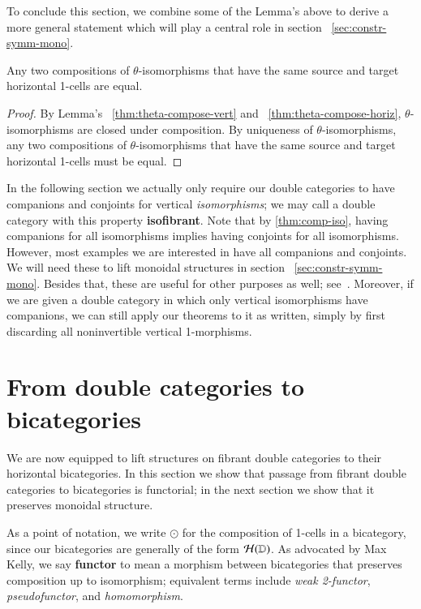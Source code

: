 \documentclass{amsart}
\begin{document}
To conclude this section, we combine some of the Lemma's above to derive a more general statement which will play a central role in section ~\ref{sec:constr-symm-mono}.

\begin{lem}\label{lem:equal}
Any two compositions of $\theta$-isomorphisms that have the same source and target horizontal 1-cells are equal.
\end{lem}

\begin{proof}
By Lemma's ~\ref{thm:theta-compose-vert} and ~\ref{thm:theta-compose-horiz}, $\theta$-isomorphisms are closed under composition. By uniqueness of $\theta$-isomorphisms, any two compositions of $\theta$-isomorphisms that have the same source and target horizontal 1-cells must be equal.
\end{proof}

\begin{rmk}
  In the following section we actually only require our double
  categories to have companions and conjoints for vertical
  \emph{isomorphisms}; we may call a double category with this
  property \textbf{isofibrant}.  Note that by \autoref{thm:comp-iso},
  having companions for all isomorphisms implies having conjoints for
  all isomorphisms.  However, most examples we are interested in have
  all companions and conjoints. We will need these to lift monoidal structures in section ~\ref{sec:constr-symm-mono}. Besides that, these are useful for other
  purposes as well; see~\cite{shulman:frbi}.  Moreover, if we are
  given a double category in which only vertical isomorphisms have
  companions, we can still apply our theorems to it as written, simply
  by first discarding all noninvertible vertical 1-morphisms.
\end{rmk}

\section{From double categories to bicategories}
\label{sec:1x1-to-bicat}

We are now equipped to lift structures on fibrant double categories to
their horizontal bicategories.  In this section we show that passage
from fibrant double categories to bicategories is functorial; in the
next section we show that it preserves monoidal structure.

As a point of notation, we write $\odot$ for the composition of
1-cells in a bicategory, since our bicategories are generally of the
form $\mathcal{H}(\mathbb{D})$.  As advocated by Max Kelly, we say \textbf{functor}
to mean a morphism between bicategories that preserves composition up
to isomorphism; equivalent terms include \emph{weak 2-functor},
\emph{pseudofunctor}, and \emph{homomorphism}.
\end{document}

